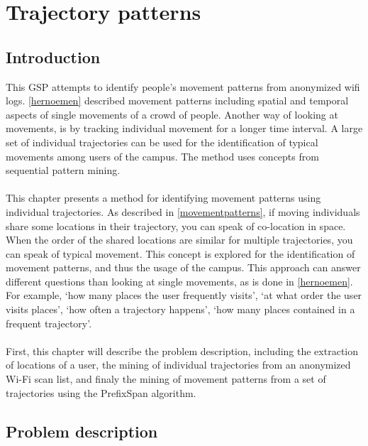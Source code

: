 \chapter{Trajectory patterns}
\section{Introduction}
This GSP attempts to identify people’s movement patterns from anonymized wifi logs. \autoref{hernoemen} described movement patterns including spatial and temporal aspects of single movements of a crowd of people. Another way of looking at movements, is by tracking individual movement for a longer time interval. A large set of individual trajectories can be used for the identification of typical movements among users of the campus. The method uses concepts from sequential pattern mining. \\\\
This chapter presents a method for identifying movement patterns using individual trajectories. As described in \autoref{movementpatterns}, if moving individuals share some locations in their trajectory, you can speak of co-location in space. When the order of the shared locations are similar for multiple trajectories, you can speak of typical movement. This concept is explored for the identification of movement patterns, and thus the usage of the campus. This approach can answer different questions than looking at single movements, as is done in \autoref{hernoemen}. For example, ‘how many places the user frequently visits’, ‘at what order the user visits places’, ‘how often a trajectory happens’, ‘how many places contained in a frequent trajectory’.\\\\
First, this chapter will describe the problem description, including the extraction of locations of a user, the mining of individual trajectories from an anonymized Wi-Fi scan list, and finaly the mining of movement patterns from a set of trajectories using the PrefixSpan algorithm.
\section{Problem description}
